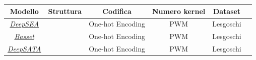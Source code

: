 \begin{table}[!h]
    \centering
    \renewcommand{\arraystretch}{2}
    \begin{tabular}{|c|c|c|c|c|c|} %
        \hline %
        \textbf{Modello} & \textbf{Struttura} & \textbf{Codifica} & \textbf{Numero kernel} & \textbf{Dataset} \\ 
        \hline\hline %
        \hyperref[sec:DeepSEA]{\textsl{DeepSEA}} & & One-hot Encoding & \acs{PWM} & Lesgoschi \\ 
        \hyperref[sec:Basset]{\textsl{Basset}} & & One-hot Encoding & \acs{PWM} & Lesgoschi \\ 
        \hyperref[sec:DeepSATA]{\textsl{DeepSATA}} & & One-hot Encoding & \acs{PWM} & Lesgoschi \\ 
        \hline
    \end{tabular}
    \renewcommand{\arraystretch}{1}
\end{table}






